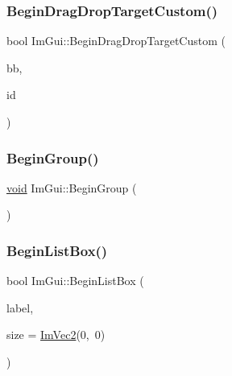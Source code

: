 \subsubsection{\texorpdfstring{Begin\+Drag\+Drop\+Target\+Custom()}{BeginDragDropTargetCustom()}}
{\footnotesize\ttfamily bool Im\+Gui\+::\+Begin\+Drag\+Drop\+Target\+Custom (\begin{DoxyParamCaption}\item[{const \hyperlink{structImRect}{Im\+Rect} \&}]{bb,  }\item[{Im\+Gui\+ID}]{id }\end{DoxyParamCaption})}

\mbox{\label{namespaceImGui_a42407e196b7ed2a8755bff28aae9805f}} 
\subsubsection{\texorpdfstring{Begin\+Group()}{BeginGroup()}}
{\footnotesize\ttfamily \hyperlink{imgui__impl__opengl3__loader_8h_ac668e7cffd9e2e9cfee428b9b2f34fa7}{void} Im\+Gui\+::\+Begin\+Group (\begin{DoxyParamCaption}{ }\end{DoxyParamCaption})}

\mbox{\label{namespaceImGui_a2f37c541760a39c189ebdd86c15b60d9}} 
\subsubsection{\texorpdfstring{Begin\+List\+Box()}{BeginListBox()}}
{\footnotesize\ttfamily bool Im\+Gui\+::\+Begin\+List\+Box (\begin{DoxyParamCaption}\item[{const char $\ast$}]{label,  }\item[{const \hyperlink{structImVec2}{Im\+Vec2} \&}]{size = {\ttfamily \hyperlink{structImVec2}{Im\+Vec2}(0,~0)} }\end{DoxyParamCaption})}

\mbox{\label{namespaceImGui_a55cb9cfb9865204ac6fb21c965784f78}} 
